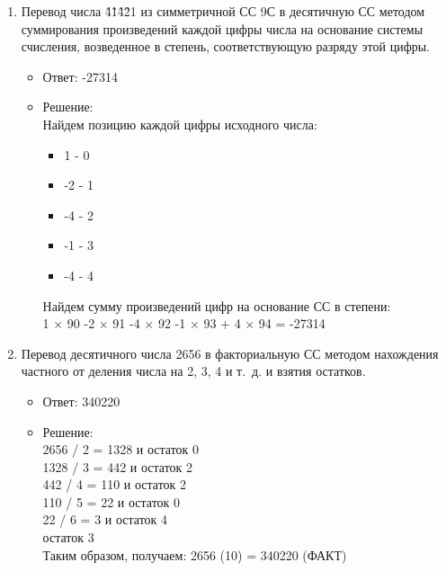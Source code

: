 \documentclass[14pt,final,oneside]{extreport}%
\newcommand\Subsection[1]{
\refstepcounter{subsection}
\subsection*{%
\raggedright%
\arabic{section}. \arabic{subsection}. #1
}
\addcontentsline{toc}{subsection}{\arabic{subsection}. #1}
}
\begin{document}
\begin{enumerate}
        \item Перевод числа {\^4}{\^1}{\^4}{\^2}1 из симметричной СС 9С в десятичную СС методом суммирования произведений каждой цифры числа на основание системы счисления, возведенное в степень, соответствующую разряду этой цифры.
        \begin{itemize}
            \item Ответ: -27314
            \item Решение: \\
            Найдем позицию каждой цифры исходного числа:
            \begin{itemize}
                \item 1 - 0
                \item -2 - 1
                \item -4 - 2
                \item -1 - 3
                \item -4 - 4
            \end{itemize}
            Найдем сумму произведений цифр на основание СС в степени: \\
            1 × 90 -2 × 91 -4 × 92 -1 × 93 + 4 × 94 = -27314 
        \end{itemize}

        \item Перевод десятичного числа 2656 в факториальную СС методом нахождения частного от деления числа на 2, 3, 4 и т. д. и взятия остатков.
        \begin{itemize}
            \item Ответ: 340220
            \item Решение: \\
                2656 / 2 = 1328 и остаток 0 \\
                1328 / 3 = 442 и остаток 2 \\
                442 / 4 = 110 и остаток 2 \\
                110 / 5 = 22 и остаток 0 \\
                22 / 6 = 3 и остаток 4 \\
                остаток 3 \\

                Таким образом, получаем: 2656 (10) = 340220 (ФАКТ)
        \end{itemize}

    \end{enumerate}

%     
\end{document}
